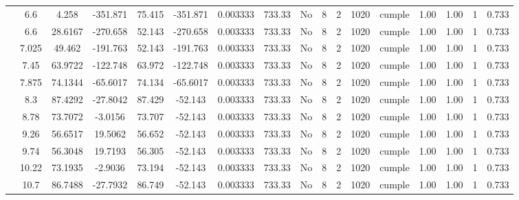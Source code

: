 \begin{table}[H]
{\begin{tabular}{|c|c|c|c|c|c|c|c|c|c|c|c|c|c|c|c|c|}
\cline{2-17}        & \cellcolor[rgb]{ .851,  .882,  .949}6.6 & 4.258 & -351.871 & 75.415 & -351.871 & 0.003333 & 733.33 & No  & 8   & 2   & 1020 & \cellcolor[rgb]{ .776,  .937,  .808}cumple & 1.00 & 1.00 & 1   & 0.733 \bigstrut\\
\cline{2-17}        & \cellcolor[rgb]{ .851,  .882,  .949}6.6 & 28.6167 & -270.658 & 52.143 & -270.658 & 0.003333 & 733.33 & No  & 8   & 2   & 1020 & \cellcolor[rgb]{ .776,  .937,  .808}cumple & 1.00 & 1.00 & 1   & 0.733 \bigstrut\\
\cline{2-17}        & 7.025 & 49.462 & -191.763 & 52.143 & -191.763 & 0.003333 & 733.33 & No  & 8   & 2   & 1020 & \cellcolor[rgb]{ .776,  .937,  .808}cumple & 1.00 & 1.00 & 1   & 0.733 \bigstrut\\
\cline{2-17}        & 7.45 & 63.9722 & -122.748 & 63.972 & -122.748 & 0.003333 & 733.33 & No  & 8   & 2   & 1020 & \cellcolor[rgb]{ .776,  .937,  .808}cumple & 1.00 & 1.00 & 1   & 0.733 \bigstrut\\
\cline{2-17}        & 7.875 & 74.1344 & -65.6017 & 74.134 & -65.6017 & 0.003333 & 733.33 & No  & 8   & 2   & 1020 & \cellcolor[rgb]{ .776,  .937,  .808}cumple & 1.00 & 1.00 & 1   & 0.733 \bigstrut\\
\cline{2-17}        & 8.3 & 87.4292 & -27.8042 & 87.429 & -52.143 & 0.003333 & 733.33 & No  & 8   & 2   & 1020 & \cellcolor[rgb]{ .776,  .937,  .808}cumple & 1.00 & 1.00 & 1   & 0.733 \bigstrut\\
\cline{2-17}        & 8.78 & 73.7072 & -3.0156 & 73.707 & -52.143 & 0.003333 & 733.33 & No  & 8   & 2   & 1020 & \cellcolor[rgb]{ .776,  .937,  .808}cumple & 1.00 & 1.00 & 1   & 0.733 \bigstrut\\
\cline{2-17}        & 9.26 & 56.6517 & 19.5062 & 56.652 & -52.143 & 0.003333 & 733.33 & No  & 8   & 2   & 1020 & \cellcolor[rgb]{ .776,  .937,  .808}cumple & 1.00 & 1.00 & 1   & 0.733 \bigstrut\\
\cline{2-17}        & 9.74 & 56.3048 & 19.7193 & 56.305 & -52.143 & 0.003333 & 733.33 & No  & 8   & 2   & 1020 & \cellcolor[rgb]{ .776,  .937,  .808}cumple & 1.00 & 1.00 & 1   & 0.733 \bigstrut\\
\cline{2-17}        & 10.22 & 73.1935 & -2.9036 & 73.194 & -52.143 & 0.003333 & 733.33 & No  & 8   & 2   & 1020 & \cellcolor[rgb]{ .776,  .937,  .808}cumple & 1.00 & 1.00 & 1   & 0.733 \bigstrut\\
\cline{2-17}        & 10.7 & 86.7488 & -27.7932 & 86.749 & -52.143 & 0.003333 & 733.33 & No  & 8   & 2   & 1020 & \cellcolor[rgb]{ .776,  .937,  .808}cumple & 1.00 & 1.00 & 1   & 0.733 \bigstrut\\

\end{tabular}}
\end{table}
